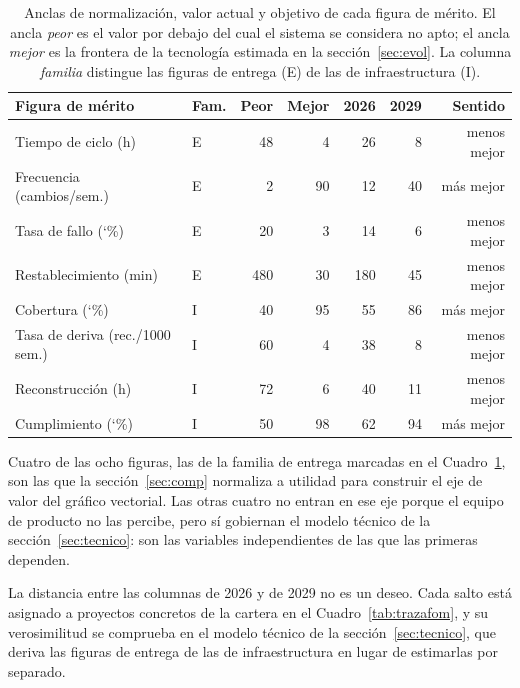 \documentclass[11pt,letterpaper]{article}
\newcommand{\pct}{\char`\%}  %
\begin{document}
\begin{table}[htbp]
  \centering
  \footnotesize
  \setlength{\tabcolsep}{4pt}
  \caption{Anclas de normalización, valor actual y objetivo de cada figura de
  mérito. El ancla \emph{peor} es el valor por debajo del cual el sistema se
  considera no apto; el ancla \emph{mejor} es la frontera de la tecnología
  estimada en la sección~\ref{sec:evol}. La columna \emph{familia} distingue
  las figuras de entrega (E) de las de infraestructura (I).}
  \label{tab:anclas}
  \begin{tabular}{@{}llrrrrr@{}}
    \toprule
    \textbf{Figura de mérito} & \textbf{Fam.} & \textbf{Peor} &
      \textbf{Mejor} & \textbf{2026} & \textbf{2029} &
      \textbf{Sentido} \\
    \midrule
    Tiempo de ciclo (h)            & E &  48 &   4 &  26 &   8 & menos mejor \\
    Frecuencia (cambios/sem.)      & E &   2 &  90 &  12 &  40 & más mejor \\
    Tasa de fallo (\pct)           & E &  20 &   3 &  14 &   6 & menos mejor \\
    Restablecimiento (min)         & E & 480 &  30 & 180 &  45 & menos mejor \\
    Cobertura (\pct)               & I &  40 &  95 &  55 &  86 & más mejor \\
    Tasa de deriva (rec./1000 sem.)& I &  60 &   4 &  38 &   8 & menos mejor \\
    Reconstrucción (h)             & I &  72 &   6 &  40 &  11 & menos mejor \\
    Cumplimiento (\pct)            & I &  50 &  98 &  62 &  94 & más mejor \\
    \bottomrule
  \end{tabular}
\end{table}

Cuatro de las ocho figuras, las de la familia de entrega marcadas en el
Cuadro~\ref{tab:anclas}, son las que la sección~\ref{sec:comp} normaliza a
utilidad para construir el eje de valor del gráfico vectorial. Las otras
cuatro no entran en ese eje porque el equipo de producto no las percibe, pero
sí gobiernan el modelo técnico de la sección~\ref{sec:tecnico}: son las
variables independientes de las que las primeras dependen.

La distancia entre las columnas de 2026 y de 2029 no es un deseo. Cada salto
está asignado a proyectos concretos de la cartera en el
Cuadro~\ref{tab:trazafom}, y su verosimilitud se comprueba en el modelo
técnico de la sección~\ref{sec:tecnico}, que deriva las figuras de entrega de
las de infraestructura en lugar de estimarlas por separado.
\end{document}
